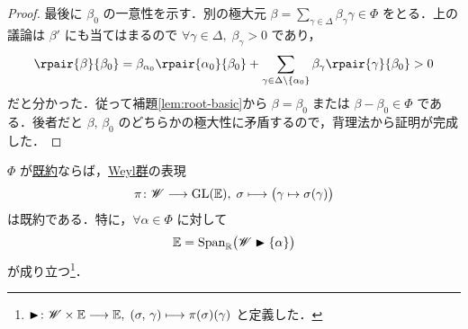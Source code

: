 \documentclass[rep_main]{subfiles}
\begin{document}
\begin{proof}
	最後に $\beta_0$ の一意性を示す．別の極大元 $\beta = \sum_{\gamma \in \Delta} \beta_\gamma \gamma \in \Phi$ をとる．上の議論は $\beta'$ にも当てはまるので $\forall \gamma \in \Delta,\; \beta_\gamma > 0$ であり，
	\begin{align}
		\rpair{\beta}{\beta_0} = \beta_{\alpha_0} \rpair{\alpha_0}{\beta_0} + \sum_{\gamma \in \Delta \setminus \{\alpha_0\}} \beta_\gamma \rpair{\gamma}{\beta_0} > 0
	\end{align}
	だと分かった．従って補題\ref{lem:root-basic}から $\beta = \beta_0$ または $\beta - \beta_0 \in \Phi$ である．後者だと $\beta,\, \beta_0$ のどちらかの極大性に矛盾するので，背理法から証明が完成した．
\end{proof}


\begin{mylem}[label=lem:irr-root-B]{}
	$\Phi$ が\hyperref[def:irr-root]{既約}ならば，\hyperref[def:Weylgroup]{Weyl群}の表現
	\begin{align}
		\pi \colon \mathscr{W} \longrightarrow \mathrm{GL}(\mathbb{E}),\; \sigma \longmapsto \bigl( \gamma \mapsto \sigma(\gamma) \bigr) 
	\end{align}
	は既約である．特に，$\forall \alpha \in \Phi$ に対して
	\begin{align}
		\mathbb{E} = \operatorname{Span}_{\mathbb{R}} \bigl(\mathscr{W} \blacktriangleright \{\alpha\}\bigr)
	\end{align}
	が成り立つ\footnote{$\blacktriangleright \colon \mathscr{W} \times \mathbb{E} \longrightarrow \mathbb{E},\; (\sigma,\, \gamma) \longmapsto \pi(\sigma)(\gamma)$ と定義した．}．
\end{mylem}
\end{document}
